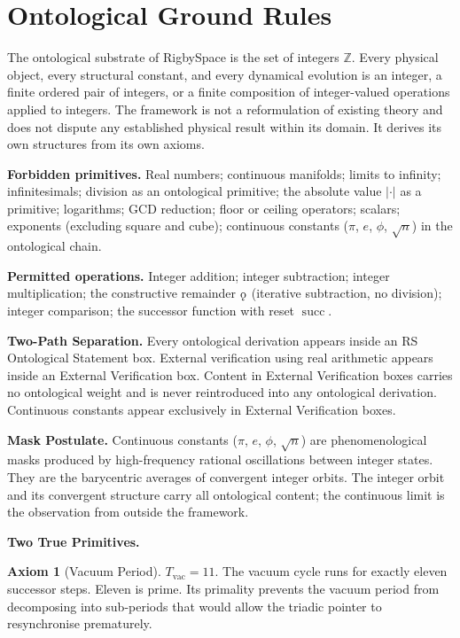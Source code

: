 \documentclass[11pt,letterpaper]{article}
\theoremstyle{plain}
\theoremstyle{definition}
\newtheorem{axiom}{Axiom}
\theoremstyle{remark}
\newcommand{\Z}{\mathbb{Z}}
\renewcommand{\succ}{\operatorname{succ}}
\newcommand{\koppa}{\mathbin{\text{\rm\k{o}}}}
\newcommand{\Tvac}{T_{\mathrm{vac}}}
\begin{document}
\section{Ontological Ground Rules}

The ontological substrate of RigbySpace is the set of integers $\Z$.
Every physical object, every structural constant, and every dynamical
evolution is an integer, a finite ordered pair of integers, or a finite
composition of integer-valued operations applied to integers.  The
framework is not a reformulation of existing theory and does not dispute
any established physical result within its domain.  It derives its own
structures from its own axioms.

\medskip
\noindent\textbf{Forbidden primitives.}
Real numbers; continuous manifolds; limits to infinity; infinitesimals;
division as an ontological primitive; the absolute value $|\cdot|$ as
a primitive; logarithms; GCD reduction; floor or ceiling operators;
scalars; exponents (excluding square and cube); continuous constants
($\pi$, $e$, $\phi$, $\sqrt{n}$) in the ontological chain.

\medskip
\noindent\textbf{Permitted operations.}
Integer addition; integer subtraction; integer multiplication; the
constructive remainder $\koppa$ (iterative subtraction, no division);
integer comparison; the successor function with reset $\succ$.

\medskip
\noindent\textbf{Two-Path Separation.}
Every ontological derivation appears inside an RS Ontological Statement
box.  External verification using real arithmetic appears inside an
External Verification box.  Content in External Verification boxes
carries no ontological weight and is never reintroduced into any
ontological derivation.  Continuous constants appear exclusively in
External Verification boxes.

\medskip
\noindent\textbf{Mask Postulate.}
Continuous constants ($\pi$, $e$, $\phi$, $\sqrt{n}$) are
phenomenological masks produced by high-frequency rational oscillations
between integer states.  They are the barycentric averages of
convergent integer orbits.  The integer orbit and its convergent
structure carry all ontological content; the continuous limit is the
observation from outside the framework.

\medskip
\noindent\textbf{Two True Primitives.}
\begin{axiom}[Vacuum Period]\label{ax:tvac}
$\Tvac=11$.  The vacuum cycle runs for exactly eleven successor steps.
Eleven is prime.  Its primality prevents the vacuum period from
decomposing into sub-periods that would allow the triadic pointer to
resynchronise prematurely.
\end{axiom}
\end{document}
